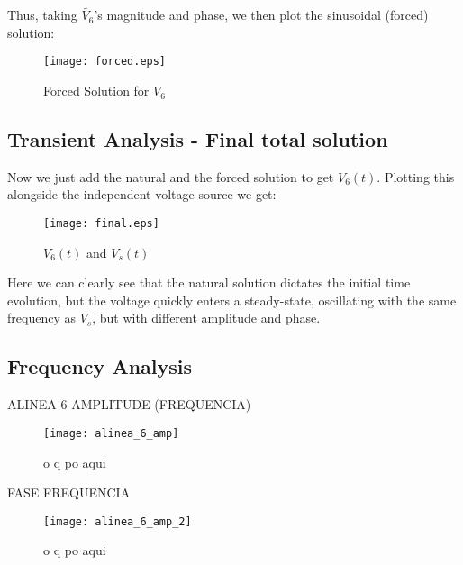 Thus, taking $\tilde{V_6}$'s magnitude and phase, we then plot the sinusoidal (forced) solution:

\begin{figure}[H]
  \centering
  \texttt{[image: forced.eps]}
  \caption{Forced Solution for $V_{6}$}
  \label{fig:OctaveForcedSolution}
\end{figure}

\subsection{Transient Analysis - Final total solution}
Now we just add the natural and the forced solution to get $V_6(t)$. Plotting this alongside the independent voltage source we get:

\begin{figure}[H]
  \centering
  \texttt{[image: final.eps]}
  \caption{$V_6(t)$ and $V_s(t)$}
  \label{fig:OctaveFinalSolution}
\end{figure}

Here we can clearly see that the natural solution dictates the initial time evolution, but the voltage quickly enters a steady-state, oscillating with the same frequency as $V_s$, but
with different amplitude and phase.

\subsection{Frequency Analysis}
ALINEA 6
AMPLITUDE (FREQUENCIA)
\begin{figure}[H]
  \centering
  \texttt{[image: alinea\_6\_amp]}
  \caption{o q po aqui}
  \label{fig:fignodos}
\end{figure}


FASE FREQUENCIA
\begin{figure}[H]
  \centering
  \texttt{[image: alinea\_6\_amp\_2]}
  \caption{o q po aqui}
  \label{fig:fignodos}
\end{figure}
